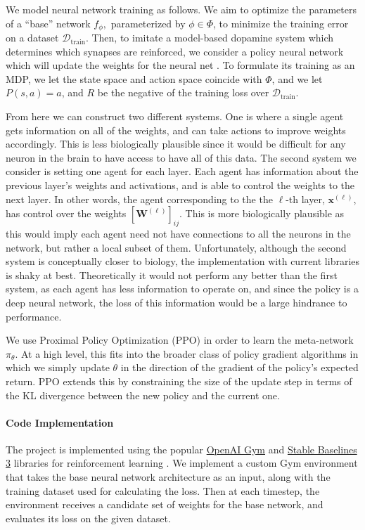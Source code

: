 \documentclass{article}
\def\*#1{\mathbf{#1}}
\begin{document}
We model neural network training as follows. We aim to optimize the parameters of a ``base'' network $f_{\phi},$ parameterized by $\phi \in \Phi$, to minimize the training error on a dataset $\mathcal{D}_{\text{train}}$. Then, to imitate a model-based dopamine
system which determines which synapses are reinforced, we consider a policy
neural network which will update the weights for the neural net \cite{wang2018pfc, botvinick2019408}. To formulate its training as an MDP, we let the state space and action space coincide with $\Phi$, and we let $P(s, a) = a$, and $R$ be the negative of the training loss over $\mathcal{D}_{\text{train}}$.

From here we can construct two different
systems. One is where a single agent gets information on all of the weights,
and can take actions to improve weights accordingly. This is less biologically plausible since it would be difficult
for any neuron in the brain to have access to have all of this data. The second system we consider is setting one agent
for each layer. Each agent has information about the previous layer's weights and activations, and is able to control
the weights to the next layer. In other words, the agent corresponding to the the $\ell$-th layer, $\*x^{(\ell)}$, has control over the weights 
$[\*W^{(\ell)}]_{ij}$. This is more biologically plausible as this would imply each agent need not have connections to all the neurons in 
the network, but rather a local subset of them. Unfortunately, although the second system is conceptually closer to biology, the implementation
with current libraries is shaky at best. Theoretically it would not perform any better than the first system, as each agent has less information
to operate on, and since the policy is a deep neural network, the loss of this information would be a large hindrance to performance.

We use Proximal Policy Optimization (PPO) \cite{schulman_ppo} in order to learn the meta-network $\pi_{\theta}$. At a high level, this fits into the broader class of policy gradient algorithms in which we simply update $\theta$ in the direction of the gradient of the policy's expected return. PPO extends this by constraining the size of the update step in terms of the KL divergence between the new policy and the current one.


\paragraph{Code Implementation} The project is implemented using the popular \href{https://www.gymlibrary.dev/}{OpenAI Gym} and \href{https://stable-baselines3.readthedocs.io/en/master/}{Stable Baselines 3} libraries for reinforcement learning \cite{openaigym, sb3}. We implement a custom Gym environment that takes the base neural network architecture as an input, along with the training dataset used for calculating the loss. Then at each timestep, the environment receives a candidate set of weights for the base network, and evaluates its loss on the given dataset.
\end{document}
